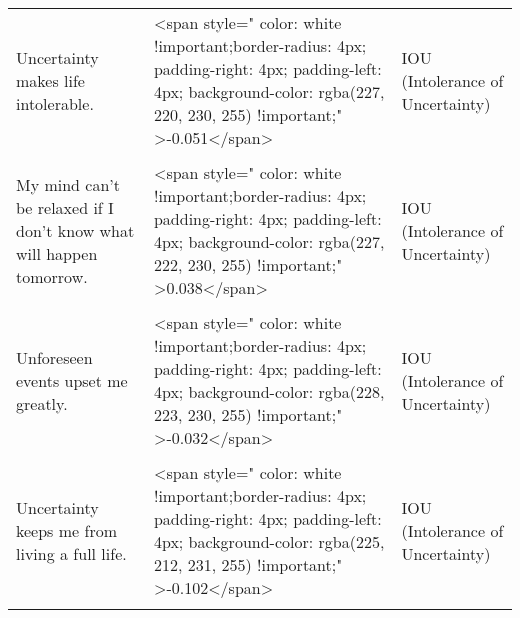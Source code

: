 \documentclass[border=1mm]{standalone}
\begin{document}
\begin{longtable}{lll}
Uncertainty makes life intolerable. & <span style="     color: white !important;border-radius: 4px; padding-right: 4px; padding-left: 4px; background-color: rgba(227, 220, 230, 255) !important;" >-0.051</span> & IOU (Intolerance of Uncertainty)\\
\addlinespace
\cellcolor{gray!10}{It's unfair not having any guarantees in life.} & \cellcolor{gray!10}{<span style="     color: white !important;border-radius: 4px; padding-right: 4px; padding-left: 4px; background-color: rgba(222, 202, 232, 255) !important;" >0.156</span>} & \cellcolor{gray!10}{IOU (Intolerance of Uncertainty)}\\
My mind can't be relaxed if I don't know what will happen tomorrow. & <span style="     color: white !important;border-radius: 4px; padding-right: 4px; padding-left: 4px; background-color: rgba(227, 222, 230, 255) !important;" >0.038</span> & IOU (Intolerance of Uncertainty)\\
\cellcolor{gray!10}{Uncertainty makes me uneasy, anxious, or stressed.} & \cellcolor{gray!10}{<span style="     color: white !important;border-radius: 4px; padding-right: 4px; padding-left: 4px; background-color: rgba(227, 221, 230, 255) !important;" >-0.048</span>} & \cellcolor{gray!10}{IOU (Intolerance of Uncertainty)}\\
Unforeseen events upset me greatly. & <span style="     color: white !important;border-radius: 4px; padding-right: 4px; padding-left: 4px; background-color: rgba(228, 223, 230, 255) !important;" >-0.032</span> & IOU (Intolerance of Uncertainty)\\
\cellcolor{gray!10}{It frustrates me not having all the information I need.} & \cellcolor{gray!10}{<span style="     color: white !important;border-radius: 4px; padding-right: 4px; padding-left: 4px; background-color: rgba(229, 228, 229, 255) !important;" >0.008</span>} & \cellcolor{gray!10}{IOU (Intolerance of Uncertainty)}\\
\addlinespace
Uncertainty keeps me from living a full life. & <span style="     color: white !important;border-radius: 4px; padding-right: 4px; padding-left: 4px; background-color: rgba(225, 212, 231, 255) !important;" >-0.102</span> & IOU (Intolerance of Uncertainty)\\
\cellcolor{gray!10}{I have saved up so many things that they get in the way.} & \cellcolor{gray!10}{<span style="     color: white !important;border-radius: 4px; padding-right: 4px; padding-left: 4px; background-color: rgba(227, 221, 230, 255) !important;" >-0.044</span>} & \cellcolor{gray!10}{OCI (Obsessive-Compulsive Inventory)}\\

\end{longtable}
\end{document}

